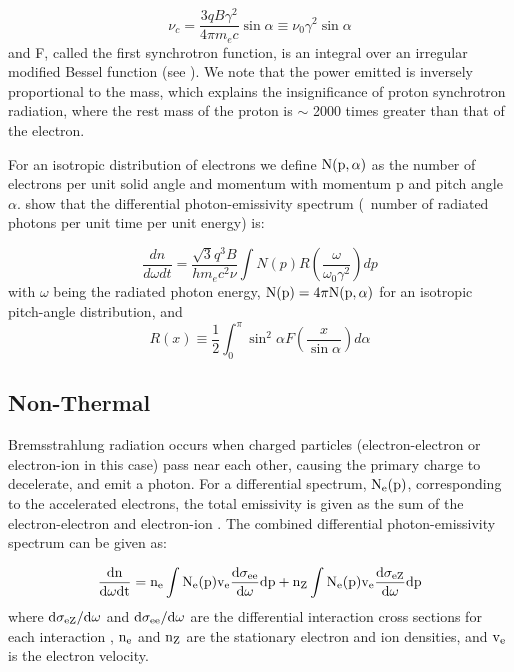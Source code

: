 \begin{equation}\label{eq:nuCrit}
\nu_c = \frac{3q B \gamma^2}{4\pi m_e c} 
\sin\alpha \equiv \nu_0 \gamma^2 \sin\alpha
\end{equation}
and F, called the first synchrotron function, is an integral over an irregular modified Bessel function (see \cite{Rybicki86}). We note that the power emitted is inversely proportional to the mass, which explains the insignificance of proton synchrotron radiation, where the rest mass of the proton is $\sim$ 2000 times greater than that of the electron.

For an isotropic distribution of electrons we define  ${\rm N(p,\alpha)}$ as the number of electrons per unit solid angle and momentum with momentum p and pitch angle $\alpha$. \cite{Houck06} show that the differential photon-emissivity spectrum (\ie{}\ number of radiated photons per unit time per unit energy) is:

\begin{equation}
\frac{d n}{d \omega d t} =
\frac{\sqrt{3}q^3 B}{h m_e c^2 \nu}
\int
N(p)
R \left(\frac{\omega}{\omega_0 \gamma^2}\right)dp
\end{equation}
with $\omega$ being the radiated photon energy, ${\rm N(p) = 4\pi N(p,\alpha)}$ for an isotropic pitch-angle distribution, and
\begin{equation}
R(x) \equiv \frac{1}{2} \int_0^\pi
\sin^2 \alpha
F\left(\frac{x}{\sin\alpha}\right) d \alpha 
\end{equation}


\subsection{Non-Thermal \brems{}}\label{gamAstr:bremss}
Bremsstrahlung radiation occurs when charged particles (electron-electron or electron-ion in this case) pass near each other, causing the  primary charge to decelerate, and emit a photon. For a differential spectrum, ${\rm N_e(p)}$, corresponding to the accelerated electrons, the total emissivity is given as the sum of the electron-electron and electron-ion \brems{}. The combined differential photon-emissivity spectrum can be given as:

\begin{equation}
{\rm \frac{d n}{d \omega d t} =
	n_e \int
	N_e(p) v_e
	\frac{d \sigma_{e e}}{d \omega}dp +
	n_Z \int
	N_e(p) v_e
	\frac{d \sigma_{e Z}}{d \omega}dp}
\end{equation}
where ${\rm d \sigma_{e Z}/d \omega}$ and ${\rm d \sigma_{e e}/d \omega}$ are the differential interaction cross sections for each interaction \citep{Koch59,Haug75}, ${\rm n_e}$ and ${\rm n_Z}$ are the stationary electron and ion densities, and ${\rm v_e}$ is the electron velocity.


